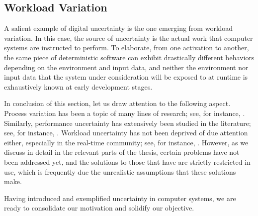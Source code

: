 \subsection{Workload Variation}

A salient example of digital uncertainty is the one emerging from workload
variation. In this case, the source of uncertainty is the actual work that
computer systems are instructed to perform. To elaborate, from one activation to
another, the same piece of deterministic software can exhibit drastically
different behaviors depending on the environment and input data, and neither the
environment nor input data that the system under consideration will be exposed
to at runtime is exhaustively known at early development stages.

\conclusioncut
In conclusion of this section, let us draw attention to the following aspect.
Process variation has been a topic of many lines of research; see, for instance,
\cite{bhardwaj2006, bhardwaj2008, chandra2010, juan2012, lee2013}. Similarly,
performance uncertainty has extensively been studied in the literature; see, for
instance, \cite{coskun2006, huang2009b, das2014c}. Workload uncertainty has not
been deprived of due attention either, especially in the real-time community;
see, for instance, \cite{diaz2002, santinelli2011, quinton2012, tanasa2015}.
However, as we discuss in detail in the relevant parts of the thesis, certain
problems have not been addressed yet, and the solutions to those that have are
strictly restricted in use, which is frequently due the unrealistic assumptions
that these solutions make.

Having introduced and exemplified uncertainty in computer systems, we are ready
to consolidate our motivation and solidify our objective.
